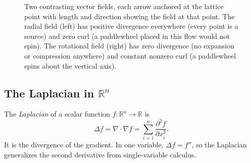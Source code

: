 \documentclass{article}
\begin{document}
\begin{figure}[H]
\centering
{}
\caption{Two contrasting vector fields, each arrow anchored at the lattice point with length and direction showing the field at that point. The radial field (left) has positive divergence everywhere (every point is a source) and zero curl (a paddlewheel placed in this flow would not spin). The rotational field (right) has zero divergence (no expansion or compression anywhere) and constant nonzero curl (a paddlewheel spins about the vertical axis).}
\label{fig:div-curl}
\end{figure}
 
\subsection{The Laplacian in $\mathbb{R}^n$}
 
The \textit{Laplacian} of a scalar function $f: \mathbb{R}^n \to \mathbb{R}$ is
$$\Delta f = \nabla \cdot \nabla f = \sum_{i=1}^n \frac{\partial^2 f}{\partial x_i^2}.$$
It is the divergence of the gradient. In one variable, $\Delta f = f''$, so the Laplacian generalizes the second derivative from single-variable calculus.
 
\end{document}
